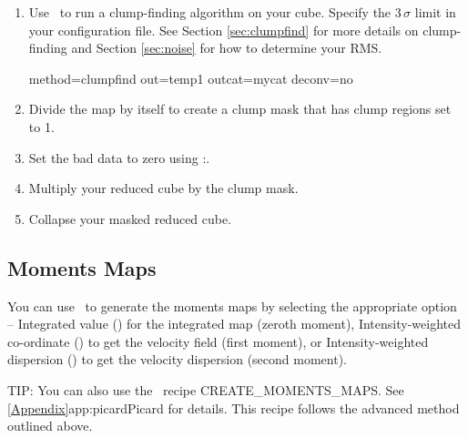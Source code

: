 \documentclass[11pt,oneside,chapters]{starlink}
\begin{document}
\begin{enumerate}[label=(\arabic*)]
\item Use \findclumps\ to run a clump-finding algorithm on your cube.
Specify the 3\,$\sigma$ limit in your configuration file. See Section
\ref{sec:clumpfind} for more details on clump-finding and Section
\ref{sec:noise} for how to determine your RMS.
\begin{terminalv}
  method=clumpfind out=temp1 outcat=mycat deconv=no
\end{terminalv}

\item Divide the map by itself to create a clump mask that has clump
regions set to 1.
\begin{terminalv}
\end{terminalv}

\item Set the bad data to zero using \Kappa:\nomagic.
\begin{terminalv}
\end{terminalv}

\item Multiply your reduced cube by the clump mask.
\begin{terminalv}
\end{terminalv}

\item Collapse your masked reduced cube.
\begin{terminalv}
\end{terminalv}
\end{enumerate}

\subsection{Moments Maps}

You can use \collapse\ to generate the moments maps by selecting the
appropriate  option -- Integrated value
() for the integrated map (zeroth moment),
Intensity-weighted co-ordinate () to get the velocity field
(first moment), or Intensity-weighted dispersion () to get the
velocity dispersion (second moment).

\begin{tip}
TIP: You can also use the \picard\ recipe CREATE\_MOMENTS\_MAPS. See
\cref{Appendix}{app:picard}{Picard} for details. This recipe follows
the advanced method outlined above.
\end{tip}
\end{document}
